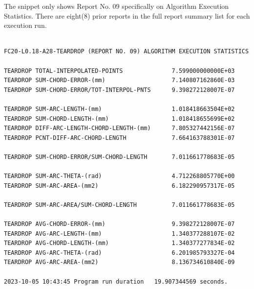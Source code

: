 The snippet only shows Report No. 09 specifically on Algorithm Execution Statistics. There are eight(8) prior reports in the full report summary list for each execution run.\\




\clearpage
\pagebreak


\begin{lstlisting}[caption={Snippet of Teardrop Algorithm Summary Output}, label=snp-Teardrop Algorithm Summary Output]	
	
FC20-L0.18-A28-TEARDROP (REPORT NO. 09) ALGORITHM EXECUTION STATISTICS 	
	
TEARDROP TOTAL-INTERPOLATED-POINTS          	7.599000000000E+03
TEARDROP SUM-CHORD-ERROR-(mm)               	7.140807162860E-03
TEARDROP SUM-CHORD-ERROR/TOT-INTERPOL-PNTS  	9.398272128007E-07
	
TEARDROP SUM-ARC-LENGTH-(mm)                	1.018418663504E+02
TEARDROP SUM-CHORD-LENGTH-(mm)              	1.018418655699E+02
TEARDROP DIFF-ARC-LENGTH-CHORD-LENGTH-(mm)  	7.805327442156E-07
TEARDROP PCNT-DIFF-ARC-CHORD-LENGTH         	7.664163788301E-07
	
TEARDROP SUM-CHORD-ERROR/SUM-CHORD-LENGTH   	7.011661778683E-05
	
TEARDROP SUM-ARC-THETA-(rad)                	4.712268805770E+00
TEARDROP SUM-ARC-AREA-(mm2)                 	6.182290957317E-05
	
TEARDROP SUM-ARC-AREA/SUM-CHORD-LENGTH      	7.011661778683E-05
	
TEARDROP AVG-CHORD-ERROR-(mm)               	9.398272128007E-07
TEARDROP AVG-ARC-LENGTH-(mm)                	1.340377288107E-02
TEARDROP AVG-CHORD-LENGTH-(mm)              	1.340377277834E-02
TEARDROP AVG-ARC-THETA-(rad)                	6.201985793327E-04
TEARDROP AVG-ARC-AREA-(mm2)                 	8.136734610840E-09
	
2023-10-05 10:43:45	Program run duration   19.907344569 seconds. 
	
\end{lstlisting}

